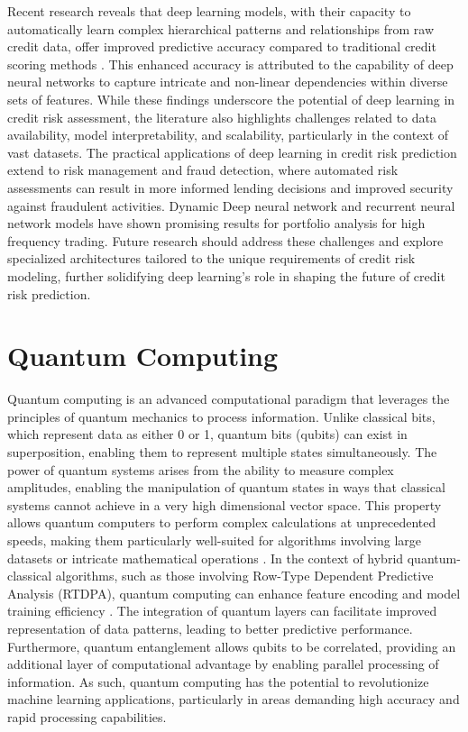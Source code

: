 \documentclass[a4paper]{article}
\begin{document}
\vspace{1cm}
\noindent Recent research reveals that deep learning models, with their capacity to automatically learn complex hierarchical patterns and relationships from raw credit data, offer improved predictive accuracy compared to traditional credit scoring methods\cite{Egger20212136} . This enhanced accuracy is attributed to the capability of deep neural networks to capture intricate and non-linear dependencies within diverse sets of features. While these findings underscore the potential of deep learning in credit risk assessment, the literature also highlights challenges related to data availability, model interpretability, and scalability, particularly in the context of vast datasets. The practical applications of deep learning in credit risk prediction extend to risk management and fraud detection, where automated risk assessments can result in more informed lending decisions and improved security against fraudulent activities. Dynamic Deep neural network and recurrent neural network models have shown promising results for portfolio analysis for high frequency trading\cite{0bacd96f632b4c96923264bc498e3ad0}\cite{CAO2023120934}.  Future research should address these challenges and explore specialized architectures tailored to the unique requirements of credit risk modeling, further solidifying deep learning's role in shaping the future of credit risk prediction.
 
\section{Quantum Computing} 
Quantum computing is an advanced computational paradigm that leverages the principles of quantum mechanics to process information. Unlike classical bits, which represent data as either 0 or 1, quantum bits (qubits) can exist in superposition, enabling them to represent multiple states simultaneously. The power of quantum systems arises from the ability to measure complex amplitudes, enabling the manipulation of quantum states in ways that classical systems cannot achieve in a very high dimensional vector space. This property allows quantum computers to perform complex calculations at unprecedented speeds, making them particularly well-suited for algorithms involving large datasets or intricate mathematical operations \cite{rath2023quantumassistedsimulationframeworkdesigning}. In the context of hybrid quantum-classical algorithms, such as those involving Row-Type Dependent Predictive Analysis (RTDPA), quantum computing can enhance feature encoding and model training efficiency \cite{rath2024quantum}. The integration of quantum layers can facilitate improved representation of data patterns, leading to better predictive performance. Furthermore, quantum entanglement allows qubits to be correlated, providing an additional layer of computational advantage by enabling parallel processing of information. As such, quantum computing has the potential to revolutionize machine learning applications, particularly in areas demanding high accuracy and rapid processing capabilities.
\end{document}
